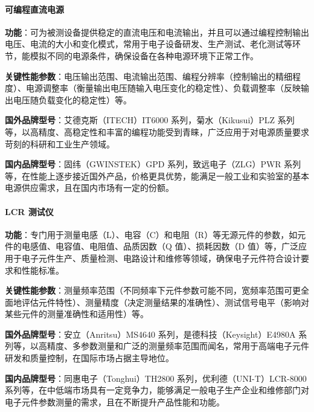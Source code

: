 \documentclass[./测控三级项目.tex]{subfiles} %
\begin{document}
			\paragraph{\qquad 可编程直流电源}\par
			\textbf{功能}：可为被测设备提供稳定的直流电压和电流输出，并且可以通过编程控制输出电压、电流的大小和变化模式，常用于电子设备研发、生产测试、老化测试等环节，能模拟不同的电源条件，确保设备在各种电源环境下正常工作。\par
			\textbf{关键性能参数}：电压输出范围、电流输出范围、编程分辨率（控制输出的精细程度）、电源调整率（衡量输出电压随输入电压变化的稳定性）、负载调整率（反映输出电压随负载变化的稳定性）等。\par
			\textbf{国外品牌型号}：艾德克斯（ITECH）IT6000 系列，菊水（Kikusui）PLZ 系列等，以高精度、高稳定性和丰富的编程功能受到青睐，广泛应用于对电源质量要求苛刻的科研和工业生产领域。\par
			\textbf{国内品牌型号}：固纬（GWINSTEK）GPD 系列，致远电子（ZLG）PWR 系列等，在性能上逐步接近国外产品，价格更具优势，能满足一般工业和实验室的基本电源供应需求，且在国内市场有一定的份额。\par
			\paragraph{\qquad LCR 测试仪}\par
			\textbf{功能}：专门用于测量电感（L）、电容（C）和电阻（R）等无源元件的参数，如元件的电感值、电容值、电阻值、品质因数（Q 值）、损耗因数（D 值）等，广泛应用于电子元件生产、质量检测、电路设计和维修等领域，确保电子元件符合设计要求和性能标准。\par
			\textbf{关键性能参数}：测量频率范围（不同频率下元件参数可能不同，宽频率范围可更全面地评估元件特性）、测量精度（决定测量结果的准确性）、测试信号电平（影响对某些元件的测量准确性和适用性）等。\par
			\textbf{国外品牌型号}：安立（Anritsu）MS4640 系列，是德科技（Keysight）E4980A 系列等，以高精度、多参数测量和广泛的测量频率范围而闻名，常用于高端电子元件研发和质量控制，在国际市场占据主导地位。\par
			\textbf{国内品牌型号}：同惠电子（Tonghui）TH2800 系列，优利德（UNI-T）LCR-8000 系列等，在中低端市场具有一定竞争力，能够满足一般电子生产企业和维修部门对电子元件参数测量的需求，且在不断提升产品性能和功能。\par
\end{document}
